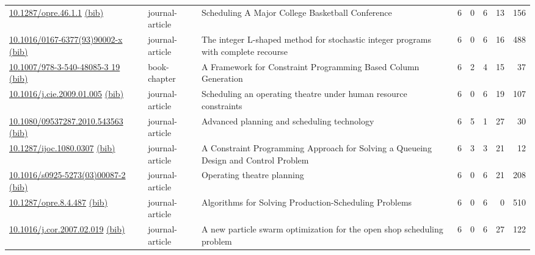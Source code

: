 {\begin{longtable}{p{5cm}lp{11cm}rrrrr}
\href{http://dx.doi.org/10.1287/opre.46.1.1}{10.1287/opre.46.1.1} \href{https://www.doi2bib.org/bib/10.1287/opre.46.1.1}{(bib)} & journal-article & Scheduling A Major College Basketball Conference & 6 & 0 & 6 & 13 & 156 \\
\href{http://dx.doi.org/10.1016/0167-6377(93)90002-x}{10.1016/0167-6377(93)90002-x} \href{https://www.doi2bib.org/bib/10.1016/0167-6377(93)90002-x}{(bib)} & journal-article & The integer L-shaped method for stochastic integer programs with complete recourse & 6 & 0 & 6 & 16 & 488 \\
\href{http://dx.doi.org/10.1007/978-3-540-48085-3_19}{10.1007/978-3-540-48085-3 19} \href{https://www.doi2bib.org/bib/10.1007/978-3-540-48085-3_19}{(bib)} & book-chapter & A Framework for Constraint Programming Based Column Generation & 6 & 2 & 4 & 15 & 37 \\
\href{http://dx.doi.org/10.1016/j.cie.2009.01.005}{10.1016/j.cie.2009.01.005} \href{https://www.doi2bib.org/bib/10.1016/j.cie.2009.01.005}{(bib)} & journal-article & Scheduling an operating theatre under human resource constraints & 6 & 0 & 6 & 19 & 107 \\
\href{http://dx.doi.org/10.1080/09537287.2010.543563}{10.1080/09537287.2010.543563} \href{https://www.doi2bib.org/bib/10.1080/09537287.2010.543563}{(bib)} & journal-article & Advanced planning and scheduling technology & 6 & 5 & 1 & 27 & 30 \\
\href{http://dx.doi.org/10.1287/ijoc.1080.0307}{10.1287/ijoc.1080.0307} \href{https://www.doi2bib.org/bib/10.1287/ijoc.1080.0307}{(bib)} & journal-article & A Constraint Programming Approach for Solving a Queueing Design and Control Problem & 6 & 3 & 3 & 21 & 12 \\
\href{http://dx.doi.org/10.1016/s0925-5273(03)00087-2}{10.1016/s0925-5273(03)00087-2} \href{https://www.doi2bib.org/bib/10.1016/s0925-5273(03)00087-2}{(bib)} & journal-article & Operating theatre planning & 6 & 0 & 6 & 21 & 208 \\
\href{http://dx.doi.org/10.1287/opre.8.4.487}{10.1287/opre.8.4.487} \href{https://www.doi2bib.org/bib/10.1287/opre.8.4.487}{(bib)} & journal-article & Algorithms for Solving Production-Scheduling Problems & 6 & 0 & 6 & 0 & 510 \\
\href{http://dx.doi.org/10.1016/j.cor.2007.02.019}{10.1016/j.cor.2007.02.019} \href{https://www.doi2bib.org/bib/10.1016/j.cor.2007.02.019}{(bib)} & journal-article & A new particle swarm optimization for the open shop scheduling problem & 6 & 0 & 6 & 27 & 122 \\

\end{longtable}}
